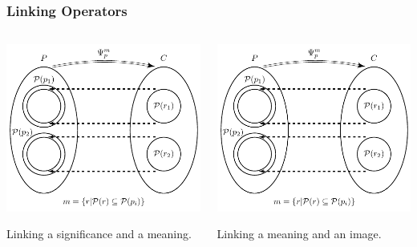 \documentclass[default]{beamer}
\begin{document}
	\begin{frame}
		\frametitle{Linking Operators}
		\begin{columns}
			\begin{column}{0.5\textwidth}
				\centering
				\includegraphics[page=2,width=\textwidth]{signs/oper_relat}
				
				Linking a significance and a meaning.
			\end{column}
			\begin{column}{0.5\textwidth}
				\centering
				\includegraphics[page=3,width=\textwidth]{signs/oper_relat}
				
				Linking a meaning and an image.
			\end{column}
		\end{columns}
	\end{frame}	
	
\end{document}
